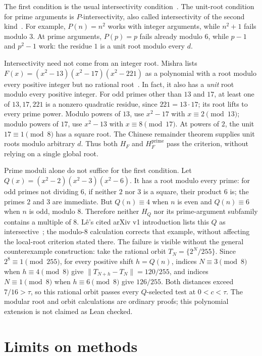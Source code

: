 \documentclass[11pt]{article}
\begin{document}
The first condition is the usual intersectivity condition~\cite{leintersective}.
The unit-root condition for prime arguments is $P$-intersectivity, also
called intersectivity of the second kind~\cite[\S1.2]{ricepintersective}. For
example, $P(n)=n^2$ works with integer arguments, while $n^2+1$ fails
modulo $3$. At prime arguments, $P(p)=p$ fails already modulo $6$, while
$p-1$ and $p^2-1$ work: the residue $1$ is a unit root modulo every $d$.

Intersectivity need not come from an integer root. Mishra lists
$F(x)=(x^2-13)(x^2-17)(x^2-221)$ as a polynomial with a root modulo
every positive integer but no rational root~\cite{mishraquadratic}. In
fact, it also has a \emph{unit} root modulo every positive integer. For
odd primes other than $13$ and $17$, at least one of $13,17,221$ is a
nonzero quadratic residue, since $221=13\cdot17$; its root lifts to every
prime power. Modulo powers of $13$, use $x^2-17$ with $x\equiv2\pmod{13}$;
modulo powers of $17$, use $x^2-13$ with $x\equiv8\pmod{17}$. At powers
of $2$, the unit $17\equiv1\pmod8$ has a square root. The Chinese
remainder theorem supplies unit roots modulo arbitrary $d$. Thus both
$H_F$ and $H_F^{\mathrm{prime}}$ pass the criterion, without relying on a
single global root.

Prime moduli alone do not suffice for the first condition. Let
$Q(x)=(x^2-2)(x^2-3)(x^2-6)$. It has a root modulo every prime: for
odd primes not dividing $6$, if neither $2$ nor $3$ is a square, their
product $6$ is; the primes $2$ and $3$ are immediate. But $Q(n)\equiv4$
when $n$ is even and $Q(n)\equiv6$ when $n$ is odd, modulo $8$.
Therefore neither $H_Q$ nor its prime-argument subfamily contains a multiple
of $8$. L\^e's cited arXiv v1 introduction lists this $Q$ as
intersective~\cite[p.~1]{leintersective}; the modulo-$8$ calculation
corrects that example, without affecting the local-root criterion stated
there. The failure is visible without the general counterexample
construction: take the rational orbit
$T_N=\{2^N/255\}$. Since $2^8\equiv1\pmod{255}$, for every positive
shift $h=Q(n)$, indices $N\equiv3\pmod8$ when $h\equiv4\pmod8$ give
$\|T_{N+h}-T_N\|=120/255$, and indices $N\equiv1\pmod8$ when
$h\equiv6\pmod8$ give $126/255$. Both distances exceed
$7/16>\tau$, so this rational orbit passes every $Q$-selected test at
$0<c<\tau$. The modular root and orbit calculations are ordinary proofs;
this polynomial extension is not claimed as Lean checked.

\section{Limits on methods}\label{sec:second}\label{sec:inventory}
\end{document}
